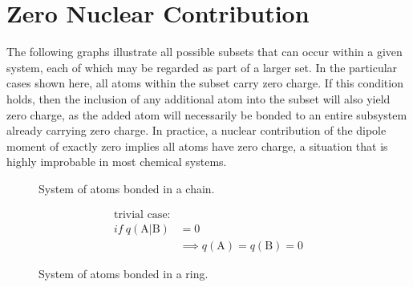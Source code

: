 \newpage
\section{Zero Nuclear Contribution}\label{zero_nuclear_contribution}

The following graphs illustrate all possible subsets that can occur within a
given system, each of which may be regarded as part of a larger set. In the
particular cases shown here, all atoms within the subset carry zero charge.  If
this condition holds, then the inclusion of any additional atom into the subset
will also yield zero charge, as the added atom will necessarily be bonded to an
entire subsystem already carrying zero charge. In practice, a nuclear
contribution of the dipole moment of exactly zero implies all atoms have zero
charge, a situation that is highly improbable in most chemical systems.

\begin{figure}[ht]
  \centering
  \scalebox{0.5}{}
  \caption{System of atoms bonded in a chain.}
  \label{first_case}
\end{figure}

\begin{align}
\text{trivial case:} \nonumber\\
  if\: q(\mathrm{A}|\mathrm{B}) &= 0 \nonumber\\
    & \implies q(\mathrm{A}) = q(\mathrm{B}) = 0
\end{align}

\newpage

\begin{figure}[ht]
  \centering
  \scalebox{.3}{}
  \caption{System of atoms bonded in a ring.}
  \label{second_case}
\end{figure}


